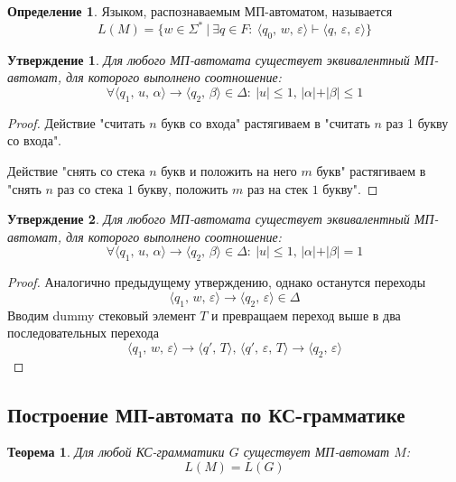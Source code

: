 \documentclass[a4paper,12pt]{article}
\renewcommand{\leq}{\ensuremath{\leqslant}}
\theoremstyle{plain}
\newtheorem{theorem}{Теорема}[subsection]
\newtheorem{proposition}{Утверждение}[subsection]
\theoremstyle{definition}
\newtheorem{definition}{Определение}[subsection]
\theoremstyle{remark}
\begin{document}
\begin{definition}
	Языком, распознаваемым МП-автоматом, называется
	\[
		L(M) = \{w \in \Sigma^* \:\vert\: \exists q \in F :\: \langle q_0,\, w,\, \varepsilon\rangle \vdash \langle q,\, \varepsilon,\, \varepsilon\rangle\}
	\]
\end{definition}

\begin{proposition}
	Для любого МП-автомата существует эквивалентный МП-автомат, для которого выполнено соотношение:
	\[
		\forall \langle q_1,\, u,\, \alpha\rangle \to \langle q_2,\, \beta\rangle \in \Delta :\: \vert u\vert \leq 1,\, \vert\alpha\vert + \vert\beta\vert \leq 1
	\]
\end{proposition}

\begin{proof}
	Действие "считать $n$ букв со входа" растягиваем в "считать $n$ раз 1 букву со входа".

	Действие "снять со стека $n$ букв и положить на него $m$ букв" растягиваем в "снять $n$ раз со стека $1$ букву, положить $m$ раз на стек $1$ букву".
\end{proof}

\begin{proposition}
	Для любого МП-автомата существует эквивалентный МП-автомат, для которого выполнено соотношение:
	\[
		\forall \langle q_1,\, u,\, \alpha\rangle \to \langle q_2,\, \beta\rangle \in \Delta :\: \vert u\vert \leq 1,\, \vert\alpha\vert + \vert\beta\vert = 1
	\]
\end{proposition}

\begin{proof}
	Аналогично предыдущему утверждению, однако останутся переходы
	\[
		\langle q_1,\, w,\, \varepsilon\rangle \to \langle q_2,\, \varepsilon\rangle \in \Delta
	\]
	Вводим dummy стековый элемент $T$ и превращаем переход выше в два последовательных перехода
	\[
		\langle q_1,\, w,\, \varepsilon\rangle \to \langle q',\,T\rangle,\, \langle q',\,\varepsilon,\, T\rangle \to \langle q_2,\, \varepsilon\rangle
	\]
\end{proof}

\subsection{Построение МП-автомата по КС-грамматике}
\begin{theorem}
	Для любой КС-грамматики $G$ существует МП-автомат $M$:
	\[
		L(M) = L(G)
	\]
\end{theorem}
\end{document}
